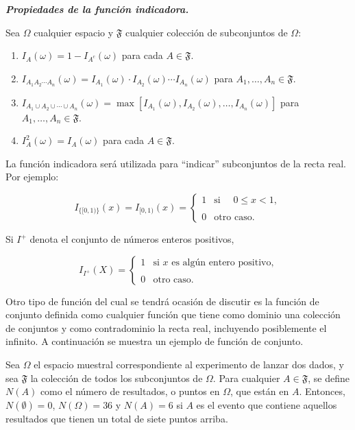 \documentclass[
  us-letterpaper,
]{scrreprt}
\theoremstyle{plain}
\theoremstyle{definition}
\theoremstyle{definition}
\theoremstyle{plain}
\theoremstyle{remark}
\begin{document}
\textbf{\emph{Propiedades de la función indicadora.}}

Sea \(\Omega\) cualquier espacio y \(\mathfrak{F}\) cualquier colección
de subconjuntos de \(\Omega\):

\begin{enumerate}
\def\labelenumi{\roman{enumi}.}
\item
  \(I_A(\omega)= 1- I_{A^c}(\omega)\) para cada \(A\in \mathfrak{F}\).
\item
  \(I_{A_1A_2\cdots A_n}(\omega)= I_{A_1}(\omega)\cdot I_{A_2}(\omega)\cdots I_{A_n}(\omega)\)
  para \(A_1,\ldots, A_n\in \mathfrak{F}\).
\item
  \(I_{A_1\cup A_2\cup\cdots\cup A_n}(\omega)= \max{[I_{A_1}(\omega), I_{A_2}(\omega),\ldots, I_{A_n}(\omega)]}\)
  para \(A_1, \ldots, A_n \in\mathfrak{F}\).
\item
  \(I_A^2(\omega)= I_A(\omega)\) para cada \(A\in\mathfrak{F}\).
\end{enumerate}

La función indicadora será utilizada para ``indicar'' subconjuntos de la
recta real. Por ejemplo:

\[I_{\{[0,1)\}}(x)= I_{[0,1)}(x)=\begin{cases} 1 & \text{si }\quad 0\leq x<1,\\ \\ 0 & \text{otro caso.} \end{cases} \]

Si \(I^+\) denota el conjunto de números enteros positivos,

\[ I_{I^+}(X)=\begin{cases} 1 & \text{si $x$ es algún entero positivo,}\\ \\ 0 & \text{otro caso.}\end{cases}\]

Otro tipo de función del cual se tendrá ocasión de discutir es la
función de conjunto definida como cualquier función que tiene como
dominio una colección de conjuntos y como contradominio la recta real,
incluyendo posiblemente el infinito. A continuación se muestra un
ejemplo de función de conjunto.

\begin{tcolorbox}[enhanced jigsaw, bottomtitle=1mm, coltitle=black, breakable, leftrule=.75mm, left=2mm, rightrule=.15mm, titlerule=0mm, toprule=.15mm, toptitle=1mm, colback=white, colframe=quarto-callout-caution-color-frame, title={Ejemplo}, colbacktitle=quarto-callout-caution-color!10!white, arc=.35mm, bottomrule=.15mm, opacitybacktitle=0.6, opacityback=0]

Sea \(\Omega\) el espacio muestral correspondiente al experimento de
lanzar dos dados, y sea \(\mathfrak{F}\) la colección de todos los
subconjuntos de \(\Omega\). Para cualquier \(A\in\mathfrak{F}\), se
define \(N(A)\) como el número de resultados, o puntos en \(\Omega\),
que están en \(A\). Entonces, \(N(\emptyset)=0\), \(N(\Omega)=36\) y
\(N(A)=6\) si \(A\) es el evento que contiene aquellos resultados que
tienen un total de siete puntos arriba.

\end{tcolorbox}
\end{document}
